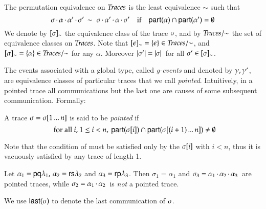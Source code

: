 \begin{definition}
The permutation equivalence on
$\textit{Traces}$ is the least equivalence $\sim$ such that
\[
\sigma\,{\cdot}\,\alpha\,{\cdot}\,\alpha'\,{\cdot}\,\sigma'\,\sim\,\,
\sigma\,{\cdot}\,\alpha'\,{\cdot}\,\alpha\,{\cdot}\,\sigma'
\quad\text{if}\quad {\sf part}(\alpha)\cap{\sf part}(\alpha')=\emptyset
\]
We denote by $[\sigma]_{\sim}$ the equivalence class of the  trace 
$\sigma$, and by $\textit{Traces}/\!\!\sim$ the set of equivalence classes on
$\textit{Traces}$. Note that $[\epsilon]_{\sim} = \{\epsilon\}\in
\textit{Traces}/\!\!\sim$, and $[\alpha]_{\sim}= \{\alpha\} \in \textit{Traces}/\!\!\sim$ for any
$\alpha$.  Moreover $|\sigma'|=|\sigma|\,$ for all
$\sigma'\in[\sigma]_{\sim}$. 
\end{definition}
%
The events associated with a global type, 
called  \emph{
  g-events}  and denoted by $\gamma, \gamma'$, are equivalence classes of
particular  traces  that we call \emph{pointed}.
Intuitively, in a pointed  trace all communications  but the last one
are causes of
 some subsequent communication. 
Formally:
\begin{definition}
A  trace   $\sigma = \sigma[1\,...\,n]$ is said to be \emph{pointed} if
\[
 \mbox{~~for all $i$, $1\leq i<n$,
$\,{\sf part}(\sigma[i])\cap{\sf part}(\sigma[(i+1)\,...\,n])\not=\emptyset
$}
\]
\end{definition}
%
Note that the condition of  must be satisfied only by the 
$\sigma[i]$ with $i < n$, thus it is vacuously satisfied by any
 trace   of length 1. 
\begin{example}
  Let $\alpha_1= {\sf p}{\sf q}\lambda_1, \,\alpha_2= {\sf r}{\sf s}\lambda_2$ and
  $\alpha_3= {\sf r}{\sf p}\lambda_3$.  Then $\sigma_1 = \alpha_1$ 
  and $\sigma_3 =
  \alpha_1\,{\cdot}\,\alpha_2\,{\cdot}\,\alpha_3\,$ are pointed
   traces,  while  $\sigma_2 = \alpha_1\,{\cdot}\,\alpha_2\,$ is
  \textit{not} a pointed trace.
\end{example}

We use ${\sf last}(\sigma)$ to denote the last communication of
$\sigma$.  


